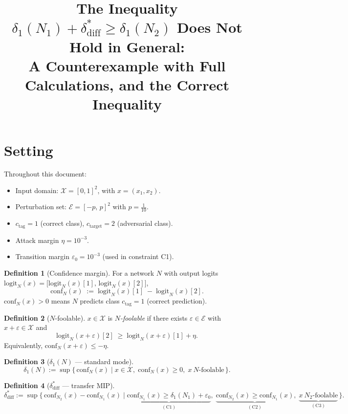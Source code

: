 \documentclass[12pt]{article}
\title{%
  The Inequality $\delta_1(N_1)+\delta_{\mathrm{diff}}^{*} \geq \delta_1(N_2)$
  Does \textbf{Not} Hold in General:\\[6pt]
  \large A Counterexample with Full Calculations,
         and the Correct Inequality}
\author{}
\date{}
\theoremstyle{definition}
\newtheorem{definition}{Definition}[section]
\theoremstyle{plain}
\theoremstyle{remark}
\newcommand{\conf}[2]{\mathrm{conf}_{#1}(#2)}
\newcommand{\dN}[1]{\delta_1(N_{#1})}
\newcommand{\ddiff}{\delta_{\mathrm{diff}}^{*}}
\newcommand{\Xdom}{\mathcal{X}}
\newcommand{\Edom}{\mathcal{E}}
\begin{document}
\maketitle
\tableofcontents
\newpage

\section{Setting}

Throughout this document:
\begin{itemize}
  \item Input domain: $\Xdom = [0,1]^2$, with $x=(x_1,x_2)$.
  \item Perturbation set: $\Edom = [-p,\,p]^2$ with $p=\tfrac{1}{10}$.
  \item $c_{\mathrm{tag}}=1$ (correct class), $c_{\mathrm{target}}=2$ (adversarial class).
  \item Attack margin $\eta = 10^{-3}$.
  \item Transition margin $\varepsilon_0 = 10^{-3}$ (used in constraint C1).
\end{itemize}

\begin{definition}[Confidence margin]\label{def:conf}
For a network $N$ with output logits
$\mathrm{logit}_N(x) = \bigl[\mathrm{logit}_N(x)[1],\,\mathrm{logit}_N(x)[2]\bigr]$,
\[
  \conf{N}{x}
  \;:=\;
  \mathrm{logit}_N(x)[1] \;-\; \mathrm{logit}_N(x)[2].
\]
$\conf{N}{x}>0$ means $N$ predicts class $c_{\mathrm{tag}}=1$ (correct prediction).
\end{definition}

\begin{definition}[$N$-foolable]\label{def:foolable}
$x\in\Xdom$ is \emph{$N$-foolable} if there exists $\varepsilon\in\Edom$ with
$x+\varepsilon\in\Xdom$ and
\[
  \mathrm{logit}_N(x+\varepsilon)[2]
  \;\geq\;
  \mathrm{logit}_N(x+\varepsilon)[1] + \eta.
\]
Equivalently, $\conf{N}{x+\varepsilon} \leq -\eta$.
\end{definition}

\begin{definition}[$\delta_1(N)$ — standard mode]\label{def:delta1}
\[
  \delta_1(N) := \sup\bigl\{\,\conf{N}{x}
    \;\big|\;
    x\in\Xdom,\;
    \conf{N}{x}\geq 0,\;
    x\ N\text{-foolable}\,\bigr\}.
\]
\end{definition}

\begin{definition}[$\ddiff$ — transfer MIP]\label{def:ddiff}
\[
  \ddiff := \sup\bigl\{\,
    \conf{N_2}{x}-\conf{N_1}{x}
    \;\big|\;
    \underbrace{\conf{N_1}{x}\geq\dN{1}+\varepsilon_0}_{(\mathrm{C1})},\;
    \underbrace{\conf{N_2}{x}\geq\conf{N_1}{x}}_{(\mathrm{C2})},\;
    \underbrace{x\ N_2\text{-foolable}}_{(\mathrm{C3})}
  \,\bigr\}.
\]
\end{definition}
\end{document}
